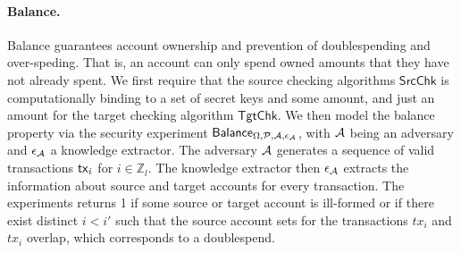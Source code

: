 \paragraph*{Balance.} Balance guarantees account ownership and prevention of doublespending and over-speding. That is, an account can only spend owned amounts that they have not already spent. We first require that the source checking algorithms $\mathsf{SrcChk}$ is computationally binding to a set of secret keys and some amount, and just an amount for the target checking algorithm $\mathsf{TgtChk}$. We then model the balance property via the security experiment $\mathsf{Balance}_{\Omega,\mathcal{P},\mathcal{A},\epsilon_{\mathcal{A}}}$, with $\mathcal{A}$ being an adversary and $\epsilon_{\mathcal{A}}$ a knowledge extractor. The adversary $\mathcal{A}$ generates a sequence of valid transactions $\mathsf{tx}_i$ for $i \in \mathbb{Z}_l$. The knowledge extractor then $\epsilon_{\mathcal{A}}$ extracts the information about source and target accounts for every transaction. The experiments returns 1 if some source or target account is ill-formed or if there exist distinct $i < i'$ such that the source account sets for the transactions $tx_i$ and $tx_i$ overlap, which corresponds to a doublespend.


